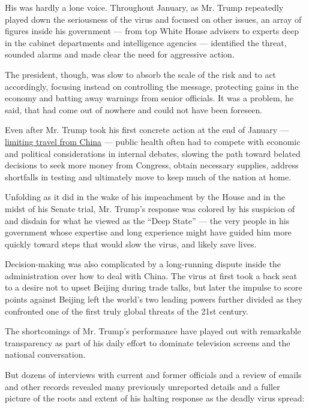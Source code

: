 His was hardly a lone voice. Throughout January, as Mr. Trump repeatedly
played down the seriousness of the virus and focused on other issues, an
array of figures inside his government --- from top White House advisers
to experts deep in the cabinet departments and intelligence agencies ---
identified the threat, sounded alarms and made clear the need for
aggressive action.

The president, though, was slow to absorb the scale of the risk and to
act accordingly, focusing instead on controlling the message, protecting
gains in the economy and batting away warnings from senior officials. It
was a problem, he said, that had come out of nowhere and could not have
been foreseen.

Even after Mr. Trump took his first concrete action at the end of
January ---
\href{https://www.nytimes.com/2020/01/31/business/china-travel-coronavirus.html}{limiting
travel from China} --- public health often had to compete with economic
and political considerations in internal debates, slowing the path
toward belated decisions to seek more money from Congress, obtain
necessary supplies, address shortfalls in testing and ultimately move to
keep much of the nation at home.

Unfolding as it did in the wake of his impeachment by the House and in
the midst of his Senate trial, Mr. Trump's response was colored by his
suspicion of and disdain for what he viewed as the ``Deep State'' ---
the very people in his government whose expertise and long experience
might have guided him more quickly toward steps that would slow the
virus, and likely save lives.

Decision-making was also complicated by a long-running dispute inside
the administration over how to deal with China. The virus at first took
a back seat to a desire not to upset Beijing during trade talks, but
later the impulse to score points against Beijing left the world's two
leading powers further divided as they confronted one of the first truly
global threats of the 21st century.

The shortcomings of Mr. Trump's performance have played out with
remarkable transparency as part of his daily effort to dominate
television screens and the national conversation.

But dozens of interviews with current and former officials and a review
of emails and other records revealed many previously unreported details
and a fuller picture of the roots and extent of his halting response as
the deadly virus spread:

